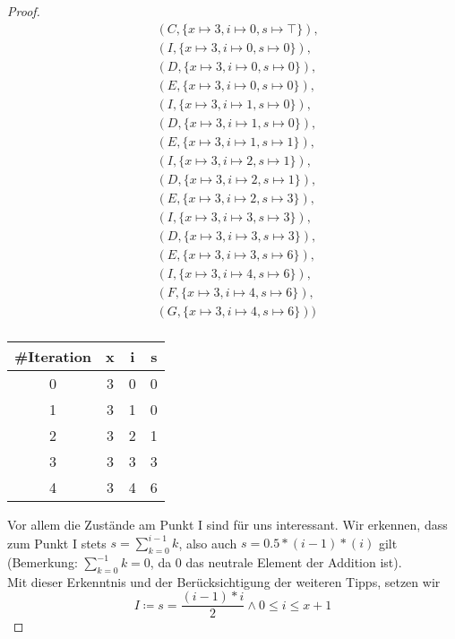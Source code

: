 \documentclass[hidelinks]{article}
\theoremstyle{plain}
\theoremstyle{definition}
\theoremstyle{rem}
\begin{document}
\begin{sloppypar}
\begin{proof}
{\begin{minipage}[ht]{0.48\linewidth}
\begin{align*}
&(C,\{x\mapsto 3,i\mapsto 0, s\mapsto \top\}),\\
&(I,\{x\mapsto 3,i\mapsto 0, s\mapsto 0\}),\\
&(D,\{x\mapsto 3,i\mapsto 0, s\mapsto 0\}),\\
&(E,\{x\mapsto 3,i\mapsto 0, s\mapsto 0\}),\\
&(I,\{x\mapsto 3,i\mapsto 1, s\mapsto 0\}),\\
&(D,\{x\mapsto 3,i\mapsto 1, s\mapsto 0\}),\\
&(E,\{x\mapsto 3,i\mapsto 1, s\mapsto 1\}),\\
&(I,\{x\mapsto 3,i\mapsto 2, s\mapsto 1\}),\\
&(D,\{x\mapsto 3,i\mapsto 2, s\mapsto 1\}),\\
&(E,\{x\mapsto 3,i\mapsto 2, s\mapsto 3\}),\\
&(I,\{x\mapsto 3,i\mapsto 3, s\mapsto 3\}),\\
&(D,\{x\mapsto 3,i\mapsto 3, s\mapsto 3\}),\\
&(E,\{x\mapsto 3,i\mapsto 3, s\mapsto 6\}),\\
&(I,\{x\mapsto 3,i\mapsto 4, s\mapsto 6\}),\\
&(F,\{x\mapsto 3,i\mapsto 4, s\mapsto 6\}),\\
&(G,\{x\mapsto 3,i\mapsto 4, s\mapsto 6\}))\\
\end{align*}
\end{minipage}}
\hfill
\begin{minipage}[ht]{0.48\linewidth}
\centering
\begin{tabular}{|c|c|c|c|}
  \hline
  \#Iteration & x & i & s\\\hline
  0 & 3 & 0 & 0\\\hline
  1 & 3 & 1 & 0\\\hline
  2 & 3 & 2 & 1\\\hline
  3 & 3 & 3 & 3\\\hline
  4 & 3 & 4 & 6\\\hline
\end{tabular}
\end{minipage}
Vor allem die Zustände am Punkt I sind für uns interessant. Wir erkennen, dass zum Punkt I stets $s=\sum_{k=0}^{i-1}k$, also auch $s=0.5*(i-1)*(i)$ gilt (Bemerkung: $\sum_{k=0}^{-1}k=0$, da 0 das neutrale Element der Addition ist).\\
Mit dieser Erkenntnis und der Berücksichtigung der weiteren Tipps, setzen wir
\begin{equation*}
I\coloneqq s=\frac{(i-1)*i}{2}\wedge 0\le i\le x+1

\end{equation*}
\end{proof}
\end{sloppypar}
\end{document}

